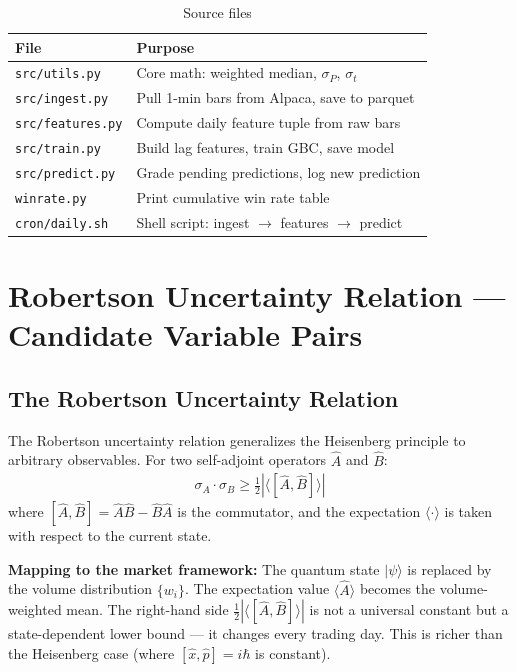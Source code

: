 \documentclass[11pt]{article}
\begin{document}
\begin{table}[htbp]
\centering
\caption{Source files}
\begin{tabular}{ll}
\toprule
File & Purpose \\
\midrule
\texttt{src/utils.py}    & Core math: weighted median, $\sigma_P$, $\sigma_t$ \\
\texttt{src/ingest.py}   & Pull 1-min bars from Alpaca, save to parquet \\
\texttt{src/features.py} & Compute daily feature tuple from raw bars \\
\texttt{src/train.py}    & Build lag features, train GBC, save model \\
\texttt{src/predict.py}  & Grade pending predictions, log new prediction \\
\texttt{winrate.py}      & Print cumulative win rate table \\
\texttt{cron/daily.sh}   & Shell script: ingest $\to$ features $\to$ predict \\
\bottomrule
\end{tabular}
\end{table}

\section{Robertson Uncertainty Relation --- Candidate Variable Pairs}

\subsection{The Robertson Uncertainty Relation}

The Robertson uncertainty relation generalizes the Heisenberg principle to arbitrary observables. For two self-adjoint operators $\hat{A}$ and $\hat{B}$:
\begin{align}
    \sigma_A \cdot \sigma_B \geq \frac{1}{2}\left|\langle [\hat{A}, \hat{B}] \rangle\right|
\end{align}
where $[\hat{A}, \hat{B}] = \hat{A}\hat{B} - \hat{B}\hat{A}$ is the commutator, and the expectation $\langle \cdot \rangle$ is taken with respect to the current state.

\textbf{Mapping to the market framework:} The quantum state $|\psi\rangle$ is replaced by the volume distribution $\{w_i\}$. The expectation value $\langle \hat{A} \rangle$ becomes the volume-weighted mean. The right-hand side $\frac{1}{2}|\langle[\hat{A},\hat{B}]\rangle|$ is not a universal constant but a state-dependent lower bound --- it changes every trading day. This is richer than the Heisenberg case (where $[\hat{x},\hat{p}] = i\hbar$ is constant).
\end{document}
